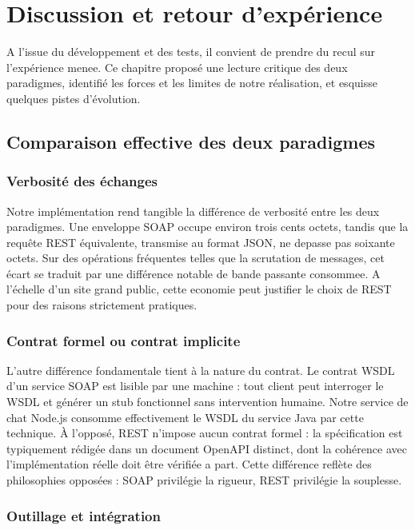 \chapter{Discussion et retour d'expérience}

A l'issue du développement et des tests, il convient de prendre du recul sur l'expérience menee. Ce chapitre proposé une lecture critique des deux paradigmes, identifié les forces et les limites de notre réalisation, et esquisse quelques pistes d'évolution.

\section{Comparaison effective des deux paradigmes}

\subsection{Verbosité des échanges}

Notre implémentation rend tangible la différence de verbosité entre les deux paradigmes. Une enveloppe SOAP  occupe environ trois cents octets, tandis que la requête REST équivalente, transmise au format JSON, ne depasse pas soixante octets. Sur des opérations fréquentes telles que la scrutation de messages, cet écart se traduit par une différence notable de bande passante consommee. A l'échelle d'un site grand public, cette economie peut justifier le choix de REST pour des raisons strictement pratiques.

\subsection{Contrat formel ou contrat implicite}

L'autre différence fondamentale tient à la nature du contrat. Le contrat WSDL d'un service SOAP est lisible par une machine : tout client peut interroger le WSDL et générer un stub fonctionnel sans intervention humaine. Notre service de chat Node.js consomme effectivement le WSDL du service Java par cette technique. À l'opposé, REST n'impose aucun contrat formel : la spécification est typiquement rédigée dans un document OpenAPI distinct, dont la cohérence avec l'implémentation réelle doit être vérifiée a part. Cette différence reflète des philosophies opposées : SOAP privilégie la rigueur, REST privilégie la souplesse.

\subsection{Outillage et intégration}

